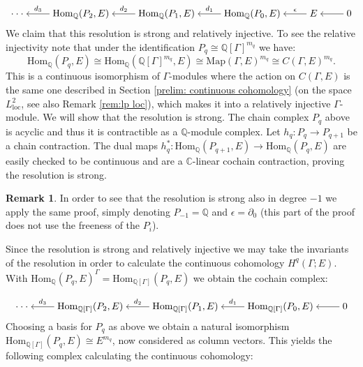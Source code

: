 \documentclass[12pt,reqno]{amsart}
\newcommand{\Q}{\mathbb{Q}}
\newcommand{\C}{\mathbb{C}}
\theoremstyle{definition}
\newtheorem{remark}[theorem]{Remark}
\begin{document}
\[\begin{tikzcd}[cramped]
	{\cdot\cdot\cdot} & {\mathrm{Hom}_\Q(P_2,E)} & {\mathrm{Hom}_\Q(P_1,E)} & {\mathrm{Hom}_\Q(P_0,E)} & E & 0
	\arrow["{d_3}"', from=1-2, to=1-1]
	\arrow["{d_2}"', from=1-3, to=1-2]
	\arrow["{d_1}"', from=1-4, to=1-3]
	\arrow["\epsilon"', from=1-5, to=1-4]
	\arrow[from=1-6, to=1-5]
\end{tikzcd}\]
We claim that this resolution is strong and relatively injective. To see the relative injectivity note that under the identification $P_q \cong \mathbb{Q}[\Gamma]^{m_q}$ we have:
$$\mathrm{Hom}_\Q(P_q,E) \cong \mathrm{Hom}_\Q(\mathbb{Q}[\Gamma]^{m_q},E) \cong \mathrm {Map}(\Gamma,E)^{m_q} \cong C(\Gamma,E)^{m_q}.$$
This is a continuous isomorphism of $\Gamma$-modules where the action on $C(\Gamma,E)$ is the same one described in Section \ref{prelim: continuous cohomology} (on the space $L^2_\mathrm{loc}$, see also Remark \ref{rem:lp loc}), which makes it into a relatively injective $\Gamma$-module.
We will show that the resolution is strong. The chain complex $P_q$ above is acyclic and thus it is contractible as a $\Q$-module complex. Let $h_q\colon P_q\to P_{q+1}$ be a chain contraction. The dual maps $h_q^*\colon \mathrm{Hom}_\Q(P_{q+1},E) \to \mathrm{Hom}_\Q(P_q,E)$ are easily checked to be continuous and are a $\C$-linear cochain contraction, proving the resolution is strong.

\begin{remark}
    In order to see that the resolution is strong also in degree $-1$ we apply the same proof, simply denoting $P_{-1} =\Q$ and $\epsilon = \partial_0$ (this part of the proof does not use the freeness of the $P_i$).
\end{remark}

Since the resolution is strong and relatively injective we may take the invariants of the resolution in order to calculate the continuous cohomology $H^q(\Gamma; E)$. With $\mathrm{Hom}_\Q(P_q,E)^\Gamma = \mathrm{Hom}_{\Q[\Gamma]}(P_q,E)$ we obtain the cochain complex:

\[\begin{tikzcd}[cramped]
	{\cdot\cdot\cdot} & {\mathrm{Hom}_{\Q[\Gamma]}(P_2,E)} & {\mathrm{Hom}_{\Q[\Gamma]}(P_1,E)} & {\mathrm{Hom}_{\Q[\Gamma]}(P_0,E)} & 0
	\arrow["{d_3}"', from=1-2, to=1-1]
	\arrow["{d_2}"', from=1-3, to=1-2]
	\arrow["{d_1}"', from=1-4, to=1-3]
	\arrow[from=1-5, to=1-4]
\end{tikzcd}\]
Choosing a basis for $P_q$ as above we obtain a natural isomorphism $\mathrm{Hom}_{\Q[\Gamma]}(P_q,E) \cong E^{m_q}$, now considered as column vectors. This yields the following complex calculating the continuous cohomology:
\end{document}
